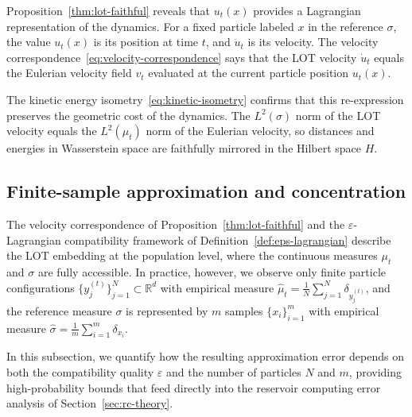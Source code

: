 \documentclass[11pt]{article}
\newcommand{\R}{\mathbb{R}}
\newcommand{\1}{\mathbf{1}}
\begin{document}
\begin{remark}\label{rem:lag-vs-eul}
Proposition~\ref{thm:lot-faithful} reveals that $u_t(x)$ provides a Lagrangian representation of the dynamics. For a fixed particle labeled $x$ in the reference $\sigma$, the value $u_t(x)$ is its position at time $t$, and $\dot u_t$ is its velocity. The velocity correspondence~\eqref{eq:velocity-correspondence} says that the LOT velocity $\dot u_t$ equals the Eulerian velocity field $v_t$ evaluated at the current particle position $u_t(x)$.

The kinetic energy isometry~\eqref{eq:kinetic-isometry} confirms that this re-expression preserves the geometric cost of the dynamics. The $L^2(\sigma)$ norm of the LOT velocity equals the $L^2(\mu_t)$ norm of the Eulerian velocity, so distances and energies in Wasserstein space are faithfully mirrored in the Hilbert space $H$.
\end{remark}


\subsection{Finite-sample approximation and concentration}\label{sec:finite-sample}

The velocity correspondence of Proposition~\ref{thm:lot-faithful} and the $\varepsilon$-Lagrangian compatibility framework of Definition~\ref{def:eps-lagrangian} describe the LOT embedding at the population level, where the continuous measures $\mu_t$ and $\sigma$ are
fully accessible. In practice, however, we observe only finite particle configurations $\{y_j^{(t)}\}_{j=1}^{N} \subset \R^d$ with empirical measure $\hat{\mu}_t = \frac{1}{N}\sum_{j=1}^{N} \delta_{y_j^{(t)}}$, and the reference measure $\sigma$ is represented by $m$ samples $\{x_i\}_{i=1}^m$ with empirical measure $\hat{\sigma} = \frac{1}{m}\sum_{i=1}^{m}\delta_{x_i}$.

In this subsection, we quantify how the resulting approximation error depends on both the compatibility quality $\varepsilon$ and the number of particles $N$ and $m$, providing high-probability bounds that feed directly into the reservoir computing error analysis of Section~\ref{sec:rc-theory}.
\end{document}
